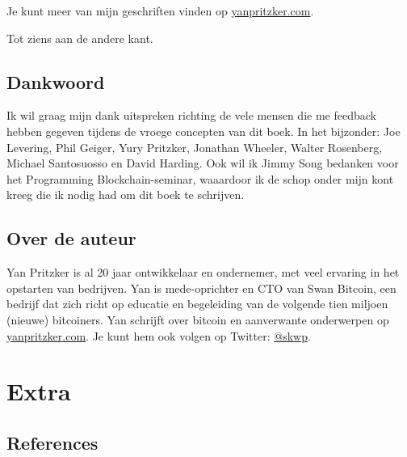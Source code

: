 \documentclass[
  letterpaper,
]{scrbook}
\newlength{\cslhangindent}
\newlength{\cslentryspacingunit} %
\newenvironment{CSLReferences}[2] %
 {%
  \setlength{\parindent}{0pt}
  \ifodd #1
  \let\oldpar\par
  \def\par{\hangindent=\cslhangindent\oldpar}
  \fi
  \setlength{\parskip}{#2\cslentryspacingunit}
 }%
 {}
\begin{document}
Je kunt meer van mijn geschriften vinden op
\href{https://yanpritzker.com}{yanpritzker.com}.

Tot ziens aan de andere kant.

\hypertarget{dankwoord}{%
\chapter*{Dankwoord}\label{dankwoord}}


Ik wil graag mijn dank uitspreken richting de vele mensen die me
feedback hebben gegeven tijdens de vroege concepten van dit boek. In het
bijzonder: Joe Levering, Phil Geiger, Yury Pritzker, Jonathan Wheeler,
Walter Rosenberg, Michael Santosuosso en David Harding. Ook wil ik Jimmy
Song bedanken voor het Programming Blockchain-seminar, waaardoor ik de
schop onder mijn kont kreeg die ik nodig had om dit boek te schrijven.

\hypertarget{over-de-auteur}{%
\chapter*{Over de auteur}\label{over-de-auteur}}


Yan Pritzker is al 20 jaar ontwikkelaar en ondernemer, met veel ervaring
in het opstarten van bedrijven. Yan is mede-oprichter en CTO van Swan
Bitcoin, een bedrijf dat zich richt op educatie en begeleiding van de
volgende tien miljoen (nieuwe) bitcoiners. Yan schrijft over bitcoin en
aanverwante onderwerpen op
\href{https://yanpritzker.com}{yanpritzker.com}. Je kunt hem ook volgen
op Twitter: \href{https://twitter.com/skwp}{@skwp}.

\part{Extra}

\hypertarget{references}{%
\chapter*{References}\label{references}}


\hypertarget{refs}{}
\begin{CSLReferences}{0}{0}
\end{CSLReferences}


\backmatter
\end{document}
